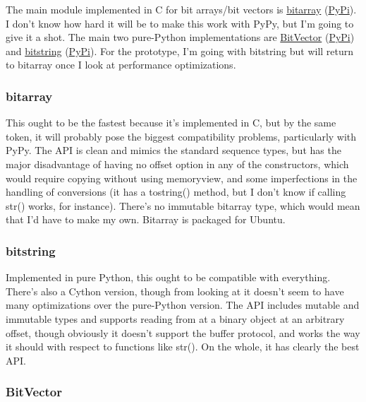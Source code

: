 \documentclass[12pt]{article}
\begin{document}
The main module implemented in C for bit arrays/bit vectors is
\href{https://github.com/ilanschnell/bitarray}{bitarray}
(\href{https://pypi.python.org/pypi/bitarray/}{PyPi}).  I don't know
how hard it will be to make this work with PyPy, but I'm going to give
it a shot.  The main two pure-Python implementations are
\href{https://engineering.purdue.edu/kak/dist/BitVector-3.3.2.html}{BitVector}
(\href{https://pypi.python.org/pypi/BitVector/3.3.2}{PyPi}) and
\href{https://code.google.com/p/python-bitstring/}{bitstring}
(\href{https://pypi.python.org/pypi/bitstring/3.1.3}{PyPi}).  For the
prototype, I'm going with bitstring but will return to bitarray once I
look at performance optimizations.

\subsubsection{bitarray}
\label{sec:bitarray}

This ought to be the fastest because it's implemented in C, but by the
same token, it will probably pose the biggest compatibility problems,
particularly with PyPy.  The API is clean and mimics the standard
sequence types, but has the major disadvantage of having no offset
option in any of the constructors, which would require copying without
using memoryview, and some imperfections in the handling of
conversions (it has a tostring() method, but I don't know if calling
str() works, for instance).  There's no immutable bitarray type, which
would mean that I'd have to make my own.  Bitarray is packaged for
Ubuntu.

\subsubsection{bitstring}
\label{sec:bitstring}

Implemented in pure Python, this ought to be compatible with
everything.  There's also a Cython version, though from looking at it
doesn't seem to have many optimizations over the pure-Python version.
The API includes mutable and immutable types and supports reading from
at a binary object at an arbitrary offset, though obviously it doesn't
support the buffer protocol, and works the way it should with respect
to functions like str().  On the whole, it has clearly the best API.

\subsubsection{BitVector}
\label{sec:bitvector}
\end{document}
